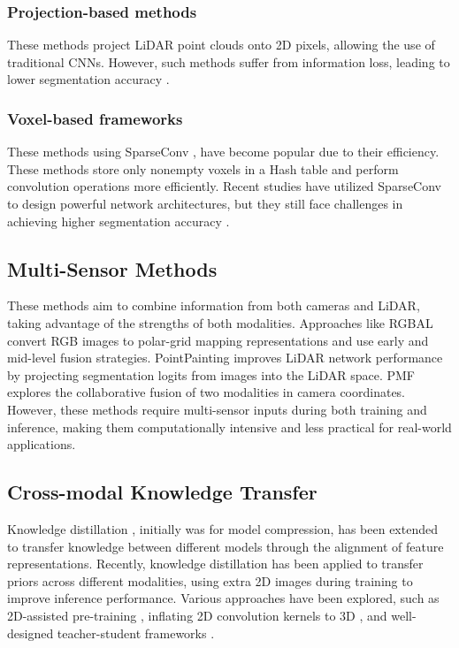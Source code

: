 \documentclass[10pt,twocolumn,letterpaper]{article}
\begin{document}
\subsubsection{Projection-based methods}
These methods project LiDAR point clouds onto 2D pixels, allowing the use of traditional CNNs. However, such methods suffer from information loss, leading to lower segmentation accuracy \cite{lawin2017deep, boulch2017unstructured, tatarchenko2018tangent,wu2018squeezeseg,wu2019squeezesegv2,liong2020amvnet}.

\subsubsection{Voxel-based frameworks}
These methods using SparseConv \cite{SparseConv}, have become popular due to their efficiency. These methods store only nonempty voxels in a Hash table and perform convolution operations more efficiently. Recent studies have utilized SparseConv \cite{?} to design powerful network architectures, but they still face challenges in achieving higher segmentation accuracy \cite{zhou2020cylinder3d,cheng20212}.

\subsection{Multi-Sensor Methods}

These methods aim to combine information from both cameras and LiDAR, taking advantage of the strengths of both modalities. 
Approaches like RGBAL \cite{el2019rgb} convert RGB images to polar-grid mapping representations and use early and mid-level fusion strategies. 
PointPainting \cite{vora2020pointpainting}  improves LiDAR network performance by projecting segmentation logits from images into the LiDAR space. 
PMF \cite{zhuang2021perception} explores the collaborative fusion of two modalities in camera coordinates. However, these methods require multi-sensor inputs during both training and inference, making them computationally intensive and less practical for real-world applications.\cite{krispel2020fuseseg,el2019rgb,meyer2019sensor,vora2020pointpainting}

\subsection{Cross-modal Knowledge Transfer}

Knowledge distillation \cite{hinton2015distilling}, initially was for model compression, has been extended to transfer knowledge between different models through the alignment of feature representations.\cite{ba2013deep,chen2017learning,zagoruyko2016paying,srinivas2018knowledge,gupta2016cross,wang2019efficient,yuan2018rgb,liu20213d,zhao2020knowledge}
Recently, knowledge distillation has been applied to transfer priors across different modalities, using extra 2D images during training to improve inference performance. 
Various approaches have been explored, such as 2D-assisted pre-training  \cite{liu2021learning}, 
inflating 2D convolution kernels to 3D \cite{xu2021image2point}, 
and well-designed teacher-student frameworks \cite{yuan2022x}.
\end{document}

